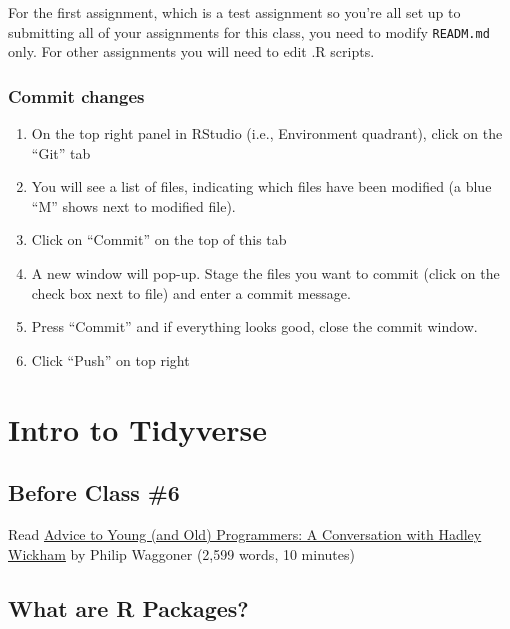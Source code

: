 \documentclass[
]{book}
\begin{document}
For the first assignment, which is a test assignment so you're all set up to submitting all of your assignments for this class, you need to modify \texttt{READM.md} only. For other assignments you will need to edit .R scripts.

\hypertarget{commit-changes}{%
\subsection{Commit changes}\label{commit-changes}}

\begin{enumerate}
\def\labelenumi{\arabic{enumi}.}
\item
  On the top right panel in RStudio (i.e., Environment quadrant), click on the ``Git'' tab
\item
  You will see a list of files, indicating which files have been modified (a blue ``M'' shows next to modified file).
\item
  Click on ``Commit'' on the top of this tab
\item
  A new window will pop-up. Stage the files you want to commit (click on the check box next to file) and enter a commit message.
\item
  Press ``Commit'' and if everything looks good, close the commit window.
\item
  Click ``Push'' on top right
\end{enumerate}

\hypertarget{intro-to-tidyverse}{%
\chapter{Intro to Tidyverse}\label{intro-to-tidyverse}}

\hypertarget{before-class-6}{%
\section{Before Class \#6}\label{before-class-6}}

Read \href{https://www.r-bloggers.com/advice-to-young-and-old-programmers-a-conversation-with-hadley-wickham/}{Advice to Young (and Old) Programmers: A Conversation with Hadley Wickham} by Philip Waggoner (2,599 words, 10 minutes)

\hypertarget{what-are-r-packages}{%
\section{What are R Packages?}\label{what-are-r-packages}}
\end{document}
